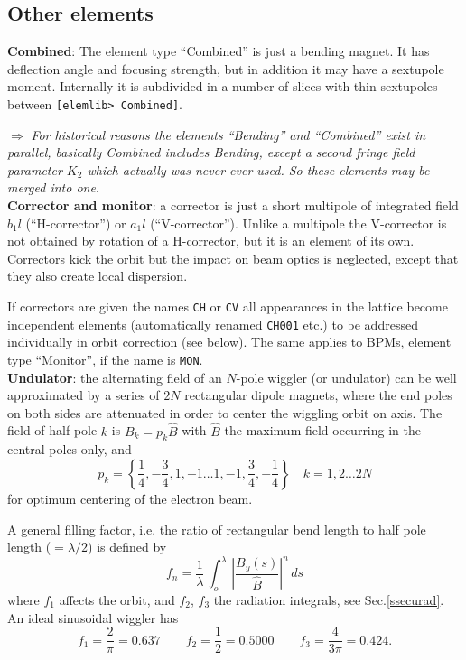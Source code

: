 \documentclass[12pt]{article}
\newcommand\beq{\begin{equation}}
\newcommand\eeq{\end{equation}}
\newcommand\todo[1]{$\Longrightarrow$ {\em #1} }
\newcommand\code[1]{{\tt [#1]}}
\begin{document}
\subsection{Other elements}
{\bf Combined}: The element type ``Combined'' is just a bending magnet. It has deflection angle and focusing strength, but in addition it may have a sextupole moment. Internally it is subdivided in a number of slices with thin sextupoles between \code{elemlib> Combined}.

\todo{For historical reasons the elements ``Bending'' and ``Combined'' exist in parallel, basically Combined includes Bending, except a second fringe field parameter $K_2$ which actually was never ever used. So these elements may be merged into one.} \\

{\bf Corrector and monitor}: a corrector is just a short multipole of integrated field $b_1l$ (``H-corrector'') or $a_1l$ (``V-corrector''). Unlike a multipole the V-corrector is not obtained by rotation of a H-corrector, but it is an element of its own. Correctors kick the orbit but the impact on beam optics is neglected, except that they also create local dispersion.

If correctors are given the names {\tt CH} or {\tt CV} all appearances in the lattice become independent elements (automatically renamed {\tt CH001} etc.) to be addressed individually in orbit correction (see below). The same applies to BPMs, element type ``Monitor'', if the name is {\tt MON}.\\

{\bf Undulator}: the alternating field of an $N$-pole wiggler (or undulator) can be well approximated by a series of $2N$ rectangular dipole magnets, where the end poles on both sides are attenuated in order to center the wiggling orbit on axis.
The field of half pole $k$
is $B_k=p_k \hat{B}$ with $\hat{B}$ the maximum field occurring in the central poles
only, and
\[
p_k=\left\{ \frac{1}{4},-\frac{3}{4}, 1, -1\dots 1, -1, \frac{3}{4}, -\frac{1}{4}\right\}\quad k=1,2\dots 2N
\]
for optimum centering of the electron beam.

A general filling factor, i.e. the ratio of rectangular bend length to half pole length
($=\lambda/2$) is defined by
\beq\label{eq:fundu}
f_n = \frac{1}{\lambda}\,\int_o^{\lambda} \,
\left| \frac{B_y(s)}{\hat{B}}\right|^n\, ds
\eeq
where $f_1$ affects the orbit, and $f_2$, $f_3$ the radiation integrals, see Sec.\ref{ssecurad}.
An ideal sinusoidal wiggler has
\beq
f_1 = \frac{2}{\pi}=0.637 \qquad f_2 = \frac{1}{2}=0.5000 \qquad f_3 = \frac{4}{3\pi}=0.424.
\eeq \\
\end{document}
